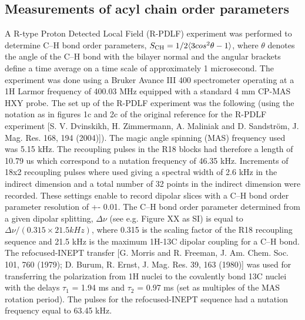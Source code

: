 \documentclass[journal=jpcbfk,manuscript=article]{achemso}
\begin{document}

\subsection{Measurements of acyl chain order parameters}
A R-type Proton Detected Local Field (R-PDLF) experiment was performed to determine C--H bond order
parameters, $S_{\rm{CH}}=1/2\langle3cos^2\theta-1\rangle$, where $\theta$ denotes the angle of the C--H bond
with the bilayer normal and the angular brackets define a time average on a time scale of approximately 1 microsecond.
The experiment was done using a Bruker Avance III 400 spectrometer operating at a 1H Larmor frequency of 400.03 MHz
equipped with a standard 4 mm CP-MAS HXY probe. The set up of the R-PDLF experiment was the following
(using the notation as in figures 1c and 2c of the original reference for the R-PDLF
experiment [S. V. Dvinskikh, H. Zimmermann, A. Maliniak and D. Sandström, J. Mag. Res. 168, 194 (2004)]).
The magic angle spinning (MAS) frequency used was 5.15 kHz. The recoupling pulses in the R18 blocks had
therefore a length of 10.79 us which correspond to a nutation frequency of 46.35 kHz. Increments of 18x2 recoupling
pulses where used giving a spectral width of 2.6 kHz in the indirect dimension and a total number of 32 points in
the indirect dimension were recorded. These settings enable to record dipolar slices with a C--H bond order parameter
resolution of +- 0.01. The C--H bond order parameter determined from a given dipolar
splitting, $\Delta\nu$ (see e.g. Figure XX as SI) is equal to $\Delta\nu/(0.315\times21.5 kHz)$, where 0.315 is
the scaling factor of the R18 recoupling sequence and 21.5 kHz is the maximum 1H-13C dipolar coupling for a C--H bond.
The refocused-INEPT transfer [G. Morris and R. Freeman, J. Am. Chem. Soc. 101, 760 (1979); D. Burum, R. Ernst, J. Mag. Res. 39, 163 (1980)]
was used for transferring the polarization from 1H nuclei to the covalently bond 13C nuclei with the delays $\tau_1$ = 1.94 ms and $\tau_2$ = 0.97 ms
(set as multiples of the MAS rotation period). The pulses for the refocused-INEPT sequence had a nutation frequency equal to 63.45 kHz.
\end{document}
